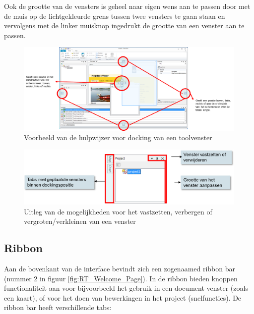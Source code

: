 Ook de grootte van de vensters is geheel naar eigen wens aan te passen door met de muis op de lichtgekleurde grens tussen twee vensters te gaan staan en vervolgens met de linker muisknop ingedrukt de grootte van een venster aan te passen.

\begin{figure}[H]
	\centering
		\includegraphics[width=\textwidth]{figures/chapter_general/rt_Docking_explained.png}
		\caption{Voorbeeld van de hulpwijzer voor docking van een toolvenster}
	\label{fig:3_Docking}
\end{figure}

\begin{figure}[H]
	\centering
		\includegraphics[width=\textwidth]{figures/chapter_general/rt_Pin_UnPin_Explained.png}
		\caption{Uitleg van de mogelijkheden voor het vastzetten, verbergen of vergroten/verkleinen van een venster}
	\label{fig:3_Pin_UnPin}
\end{figure}

\subsection{Ribbon}
	\label{sec:RT_Toolbar}
Aan de bovenkant van de interface bevindt zich een zogenaamed ribbon bar (nummer 2 in figuur \ref{fig:RT_Welcome_Page}). In de ribbon bieden knoppen functionaliteit aan voor bijvoorbeeld het gebruik in een document venster (zoals een kaart), of voor het doen van bewerkingen in het project (snelfuncties). De ribbon bar heeft verschillende tabs:

